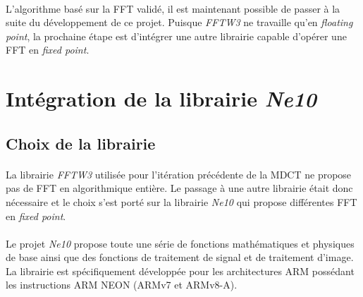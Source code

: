 \documentclass{article}
\begin{document}
    \paragraph{}
    L'algorithme basé sur la FFT validé, il est maintenant possible de passer à la suite du développement de ce projet. Puisque \emph{FFTW3} ne travaille qu'en \emph{floating point}, la prochaine étape est d'intégrer une autre librairie capable d'opérer une FFT en \emph{fixed point}.




    \newpage
    \section{Intégration de la librairie \emph{Ne10}}
    \subsection{Choix de la librairie}
    \paragraph{}
    La librairie \emph{FFTW3} utilisée pour l'itération précédente de la MDCT ne propose pas de FFT en algorithmique entière. Le passage à une autre librairie était donc nécessaire et le choix s'est porté sur la librairie \emph{Ne10} qui propose différentes FFT en \emph{fixed point}.

    \paragraph{}
    Le projet \emph{Ne10} propose toute une série de fonctions mathématiques et physiques de base ainsi que des fonctions de traitement de signal et de traitement d'image. La librairie est spécifiquement développée pour les architectures ARM possédant les instructions ARM NEON (ARMv7 et ARMv8-A)\cite{Ne10}.
\end{document}
